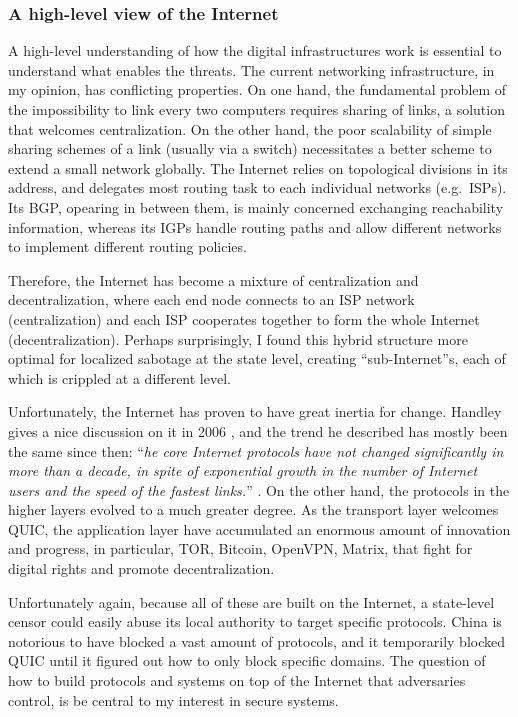 \documentclass{article}
\begin{document}
\subsubsection{A high-level view of the Internet}
A high-level understanding of how the digital infrastructures work is essential
to understand what enables the threats. The current networking infrastructure,
in my opinion, has conflicting properties. On one hand, the fundamental problem
of the impossibility to link every two computers requires sharing of links, a
solution that welcomes centralization. On the other hand, the poor scalability
of simple sharing schemes of a link (usually via a switch) necessitates a
better scheme to extend a small network globally. The Internet relies on
topological divisions in its address, and delegates most routing task to each
individual networks (e.g.\ ISPs). Its BGP, opearing in between them, is mainly
concerned exchanging reachability information, whereas its IGPs handle
routing paths and allow different networks to implement different routing
policies.

Therefore, the Internet has become a mixture of centralization and
decentralization, where each end node connects to an ISP network
(centralization) and each ISP cooperates together to form the whole Internet
(decentralization). Perhaps surprisingly, I found this hybrid structure 
more optimal for localized sabotage at the state level, creating
``sub-Internet''s, each of which is crippled at a different level. 

Unfortunately, the Internet has proven to have great inertia for change.
Handley gives a nice discussion on it in 2006 \cite{why.internet.just.works},
and the trend he described has mostly been the same since then: ``\emph{he core
Internet protocols have not changed significantly in more than a decade, in
spite of exponential growth in the number of Internet users and the speed of
the fastest links.}'' \cite{why.internet.just.works}. On the other hand, the
protocols in the higher layers evolved to a much greater degree. As the
transport layer welcomes QUIC\cite{???}, the application layer have accumulated
an enormous amount of innovation and progress, in particular, TOR\cite{???},
Bitcoin\cite{???}, OpenVPN\cite{???}, Matrix\cite{???}, that fight for digital
rights and promote decentralization.

Unfortunately again, because all of these are built on the Internet, a
state-level censor could easily abuse its local authority to target specific
protocols. China is notorious to have blocked a vast amount of protocols, and
it temporarily blocked QUIC until it figured out how to only block specific
domains. The question of how to build protocols and systems on top of the
Internet that adversaries control, is be central to my interest in secure
systems.
\end{document}
